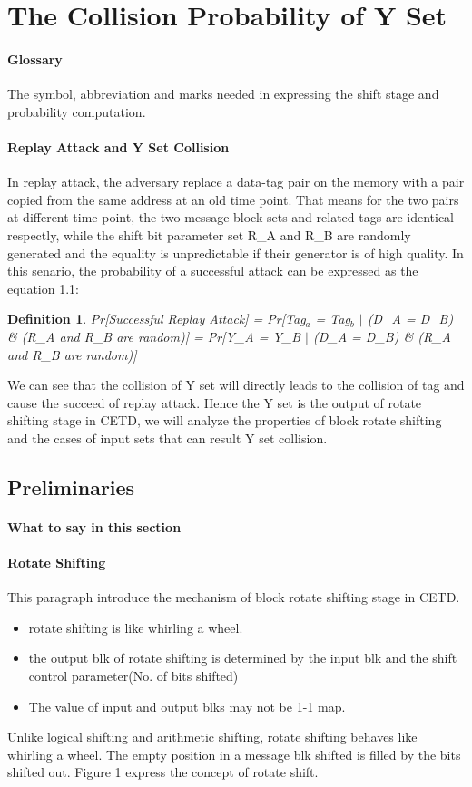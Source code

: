 \documentclass{article}
\newtheorem{defination}{Definition}[section]
\begin{document}
 

\section{The Collision Probability of Y Set}
\paragraph{Glossary} The symbol, abbreviation and marks needed in
expressing the shift stage and probability computation.
\paragraph{Replay Attack and Y Set Collision}
In replay attack, the adversary replace a data-tag pair on the memory with a pair copied from the same address at an old time point. That means for the two pairs at different time point, the two message block sets and related tags are identical respectly, while the shift bit parameter set R\_A and R\_B are randomly generated and the equality is unpredictable if their generator is of high quality.
In this senario, the probability of a successful attack can be expressed as the equation 1.1:
\begin{defination}
Pr[Successful Replay Attack] = Pr[Tag$_a$ = Tag$_b$ $\mid$ (D\_A = D\_B) \& (R\_A and R\_B are random)]
							 = Pr[Y\_A = Y\_B $\mid$ (D\_A = D\_B) \& (R\_A and R\_B are random)]
\end{defination} 

We can see that the collision of Y set will directly leads to the collision of tag and cause the succeed of replay attack. Hence the Y set is the output of rotate shifting stage in CETD, we will analyze the properties of block rotate shifting and the cases of input sets that can result Y set collision.

\subsection{Preliminaries} 
\paragraph{What to say in this section}
\paragraph{Rotate Shifting} 
This paragraph introduce the mechanism of block rotate shifting stage in CETD.  
\begin{itemize} 
	\item rotate shifting is like whirling a wheel.  
	\item the output blk of rotate shifting is determined by the input blk and
the shift control parameter(No. of bits shifted) 
	\item The value of input and output blks may not be 1-1 map.
\end{itemize} 
Unlike logical shifting and arithmetic shifting, rotate shifting
behaves like whirling a wheel. The empty position in a message blk shifted is
filled by the bits shifted out. Figure 1 express the concept of rotate shift. 
\end{document}
